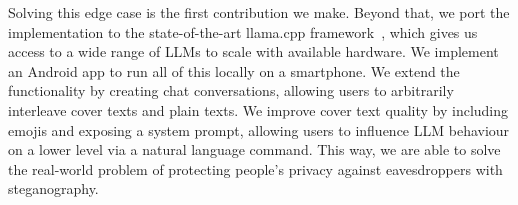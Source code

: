 Solving this edge case is the first contribution we make. Beyond that, we port the implementation to the state-of-the-art llama.cpp framework~\cite{gerganovGgerganovLlamacpp2024}, which gives us access to a wide range of \glspl{LLM} to scale with available hardware. We implement an Android app to run all of this locally on a smartphone. We extend the functionality by creating chat conversations, allowing users to arbitrarily interleave cover texts and plain texts. We improve cover text quality by including emojis and exposing a system prompt, allowing users to influence \gls{LLM} behaviour on a lower level via a natural language command. This way, we are able to solve the real-world problem of protecting people's privacy against eavesdroppers with steganography.
